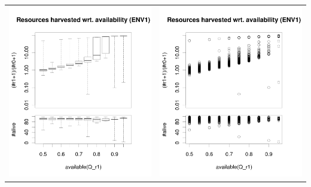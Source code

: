 \documentclass[a4paper,10pt]{article}
\begin{document}
\begin{table}[H]
\begin{tabular}{cc}
\newline
\includegraphics[width=\imgSize]{../images/5StaticEnv/ratioAndRep_staticEnv1LogY}&\includegraphics[width=\imgSize]{../images/5StaticEnv/ratioAndRep_staticEnvPlot1LogY}\\
\end{tabular}
\end{table}
\end{document}

